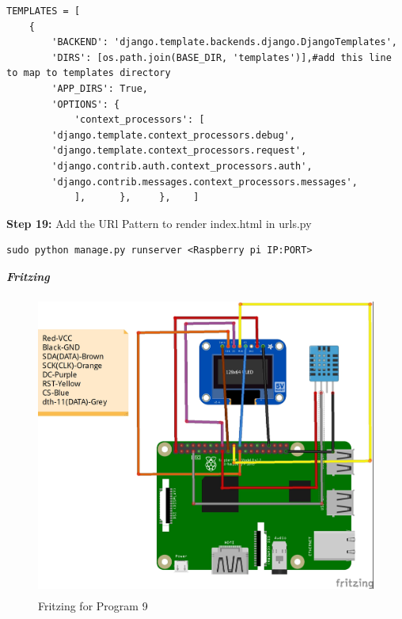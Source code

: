 \documentclass[12pt,a4paper]{article}
\begin{document}
\begin{flushleft}
\begin{lstlisting}
TEMPLATES = [
    {
        'BACKEND': 'django.template.backends.django.DjangoTemplates',
        'DIRS': [os.path.join(BASE_DIR, 'templates')],#add this line to map to templates directory
        'APP_DIRS': True,
        'OPTIONS': {
            'context_processors': [
        'django.template.context_processors.debug',
        'django.template.context_processors.request',
        'django.contrib.auth.context_processors.auth',
        'django.contrib.messages.context_processors.messages',
            ],      },     },    ]
\end{lstlisting}

\textbf{Step 19:} Add the URl Pattern to render index.html in urls.py
\begin{lstlisting}
sudo python manage.py runserver <Raspberry pi IP:PORT>
\end{lstlisting}
\clearpage
\textbf{\textit{Fritzing}} \\
\begin{figure}[h!]
    \centering
	\includegraphics[width=15cm, height=10cm]{Prog9.jpg}
	\caption{Fritzing for Program 9}
\end{figure}
\vspace{4mm}


\end{flushleft}
\end{document}

